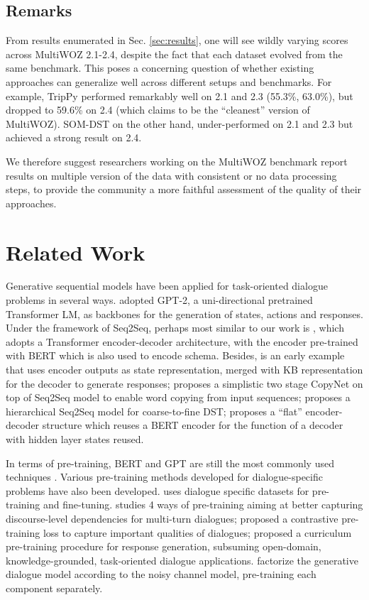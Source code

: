 \documentclass[11pt]{article}
\begin{document}
\subsection{Remarks}
From results enumerated in Sec. \ref{sec:results}, one will see wildly varying scores across MultiWOZ 2.1-2.4, despite the fact that each dataset evolved from the same benchmark. This poses a concerning question of whether existing approaches can generalize well across different setups and benchmarks. For example, TripPy performed remarkably well on 2.1 and 2.3 (55.3\%, 63.0\%), but dropped to 59.6\% on 2.4 (which claims to be the ``cleanest'' version of MultiWOZ). SOM-DST on the other hand, under-performed on 2.1 and 2.3 but achieved a strong result on 2.4.

We therefore suggest researchers working on the MultiWOZ benchmark report results on multiple version of the data with consistent or no data processing steps, to provide the community a more faithful assessment of the quality of their approaches.

\section{Related Work}
Generative sequential models have been applied for task-oriented dialogue problems in several ways. \cite{budzianowski-vulic-2019-hello,hosseiniasl2020simple,peng2021soloist} adopted GPT-2, a uni-directional pretrained Transformer LM, as backbones for the generation of states, actions and responses. Under the framework of Seq2Seq, perhaps most similar to our work is \cite{feng2020sequencetosequence}, which adopts a Transformer encoder-decoder architecture, with the encoder pre-trained with BERT which is also used to encode schema. Besides, \cite{wen-etal-2018-sequence} is an early example that uses encoder outputs as state representation, merged with KB representation for the decoder to generate responses; \cite{lei-etal-2018-sequicity} proposes a simplistic two stage CopyNet on top of Seq2Seq model to enable word copying from input sequences; \cite{chen2020credit} proposes a hierarchical Seq2Seq model for coarse-to-fine DST; \cite{zeng2021jointly} proposes a ``flat'' encoder-decoder structure which reuses a BERT encoder for the function of a decoder with hidden layer states reused.

In terms of pre-training, BERT and GPT are still the most commonly used techniques \cite{zaib2021short,zhang-etal-2020-dialogpt}. Various pre-training methods developed for dialogue-specific problems have also been developed. \cite{zhang2021improving} uses dialogue specific datasets for pre-training and fine-tuning. \cite{mehri-etal-2019-pretraining} studies 4 ways of pre-training aiming at better capturing discourse-level dependencies for multi-turn dialogues; \cite{li2020taskspecific} proposed a contrastive pre-training loss to capture important qualities of dialogues; \cite{bao2021unified} proposed a curriculum pre-training procedure for response generation, subsuming open-domain, knowledge-grounded, task-oriented dialogue applications. \cite{liu2021pretraining} factorize the generative dialogue model according to the noisy channel model, pre-training each component separately.
\end{document}

